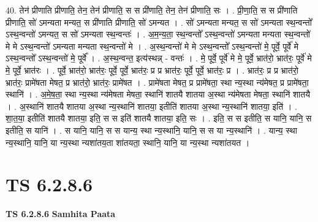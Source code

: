 \documentclass[17pt]{extarticle}
\begin{document}
40. तेन॑ प्रीणाति प्रीणाति॒ तेन॒ तेन॑ प्रीणाति॒ स स प्री॑णाति॒ तेन॒ तेन॑ प्रीणाति॒ सः । . प्री॒णा॒ति॒ स स प्री॑णाति प्रीणाति॒ सो॑ ऽमन्यता मन्यत॒ स प्री॑णाति प्रीणाति॒ सो॑ ऽमन्यत । . सो॑ ऽमन्यता मन्यत॒ स सो॑ ऽमन्यता स्थ॒न्वन्तो᳚ ऽस्थ॒न्वन्तो॑ ऽमन्यत॒ स सो॑ ऽमन्यता स्थ॒न्वन्तः॑ । . अ॒म॒न्य॒ता॒ स्थ॒न्वन्तो᳚ ऽस्थ॒न्वन्तो॑ ऽमन्यता मन्यता स्थ॒न्वन्तो॑ मे मे ऽस्थ॒न्वन्तो॑ ऽमन्यता मन्यता स्थ॒न्वन्तो॑ मे । . अ॒स्थ॒न्वन्तो॑ मे मे ऽस्थ॒न्वन्तो᳚ ऽस्थ॒न्वन्तो॑ मे॒ पूर्वे॒ पूर्वे॑ मे ऽस्थ॒न्वन्तो᳚ ऽस्थ॒न्वन्तो॑ मे॒ पूर्वे᳚ । . अ॒स्थ॒न्वन्त॒ इत्य॑स्थन्न् - वन्तः॑ । . मे॒ पूर्वे॒ पूर्वे॑ मे मे॒ पूर्वे॒ भ्रात॑रो॒ भ्रात॑रः॒ पूर्वे॑ मे मे॒ पूर्वे॒ भ्रात॑रः । . पूर्वे॒ भ्रात॑रो॒ भ्रात॑रः॒ पूर्वे॒ पूर्वे॒ भ्रात॑रः॒ प्र प्र भ्रात॑रः॒ पूर्वे॒ पूर्वे॒ भ्रात॑रः॒ प्र । . भ्रात॑रः॒ प्र प्र भ्रात॑रो॒ भ्रात॑रः॒ प्रामे॑षता मेषत॒ प्र भ्रात॑रो॒ भ्रात॑रः॒ प्रामे॑षत । . प्रामे॑षता मेषत॒ प्र प्रामे॑षता॒ स्था न्य॒स्था न्य॑मेषत॒ प्र प्रामे॑षता॒ स्थानि॑ । . अ॒मे॒ष॒ता॒ स्था न्य॒स्था न्य॑मेषता मेषता॒ स्थानि॑ शातयै शातया अ॒स्था न्य॑मेषता मेषता॒ स्थानि॑ शातयै । . अ॒स्थानि॑ शातयै शातया अ॒स्था न्य॒स्थानि॑ शातया॒ इतीति॑ शातया अ॒स्था न्य॒स्थानि॑ शातया॒ इति॑ । . शा॒त॒या॒ इतीति॑ शातयै शातया॒ इति॒ स स इति॑ शातयै शातया॒ इति॒ सः । . इति॒ स स इतीति॒ स यानि॒ यानि॒ स इतीति॒ स यानि॑ । . स यानि॒ यानि॒ स स यान्य॒ स्था न्य॒स्थानि॒ यानि॒ स स या न्य॒स्थानि॑ । . यान्य॒ स्था न्य॒स्थानि॒ यानि॒ या न्य॒स्था न्यशा॑तय॒ता शा॑तयता॒ स्थानि॒ यानि॒ या न्य॒स्था न्यशा॑तयत । \newline
\pagebreak
{}

\section{ TS 6.2.8.6 }

\textbf{TS 6.2.8.6 } \newline
\textbf{Samhita Paata} \newline
\end{document}
